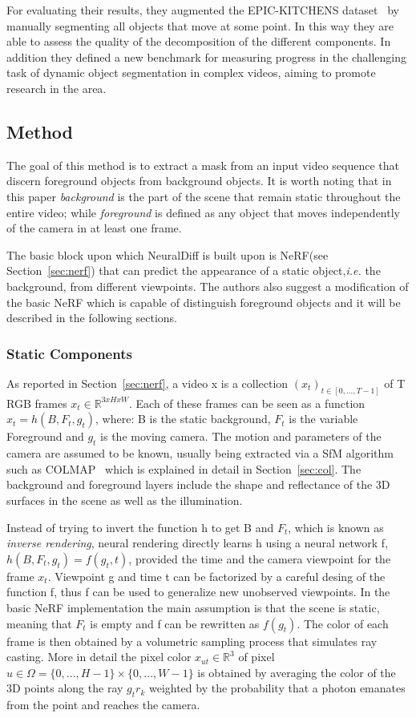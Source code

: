 For evaluating their results, they augmented the EPIC-KITCHENS dataset~\cite{EPICKITCHENS} by 
manually segmenting all objects that move at some point. In this way they are able to 
assess the quality of the decomposition of the different components. In addition they defined
a new benchmark for measuring progress in the challenging task of dynamic object segmentation
in complex videos, aiming to promote research in the area.


\subsection{Method}
The goal of this method is to extract a mask from an input video sequence that discern foreground
objects from background objects. It is worth noting that in this paper \textit{background} is 
the part of the scene that remain static throughout the entire video; while \textit{foreground}
is defined as any object that moves independently of the camera in at least one frame.

The basic block upon which NeuralDiff is built upon is NeRF(see Section~\ref{sec:nerf}) that can predict
the appearance of a static object,\textit{i.e.} the background, from different viewpoints. 
The authors also suggest a modification of the basic NeRF which is capable of 
distinguish foreground objects and it will be described in the following sections.

\subsubsection{Static Components}
As reported in Section~\ref{sec:nerf}, a video x is a collection $(x_t)_{t\in[0,...,T-1]}$
of T RGB frames $x_t \in \mathbb{R}^{3xHxW}$. Each of these frames can be seen as 
a function $x_t = h(B,F_t,g_t)$, where: B is the static background, $F_t$ is the variable
Foreground and $g_t$ is the moving camera. The motion and parameters of the camera are assumed
to be known, usually being extracted via a SfM algorithm such as COLMAP~\cite{colmap} which is 
explained in detail in Section~\ref{sec:col}. The background and foreground layers include the shape 
and reflectance of the 3D surfaces in the scene as well as the illumination.

Instead of trying to invert the function h to get B and $F_t$, which is known as \textit{inverse rendering},
neural rendering directly learns h using a neural network f, $h(B,F_t,g_t)=f(g_t,t)$, provided
the time and the camera viewpoint for the frame $x_t$. Viewpoint g and time t can be 
factorized by a careful desing of the function f, thus f can be used to generalize new unobserved
viewpoints. In the basic NeRF implementation the main assumption is that the scene is static,
meaning that $F_t$ is empty and f can be rewritten as $f(g_t)$. The color of each frame is then 
obtained by a volumetric sampling process that simulates ray casting. More in detail
the pixel color $x_{ut}\in \mathbb{R}^3$ of pixel $u \in \Omega = \{0,...,H-1\}\times\{0,...,W-1\}$ is obtained
by averaging the color of the 3D points along the ray $g_t r_k$ weighted by the probability
that a photon emanates from the point and reaches the camera.

